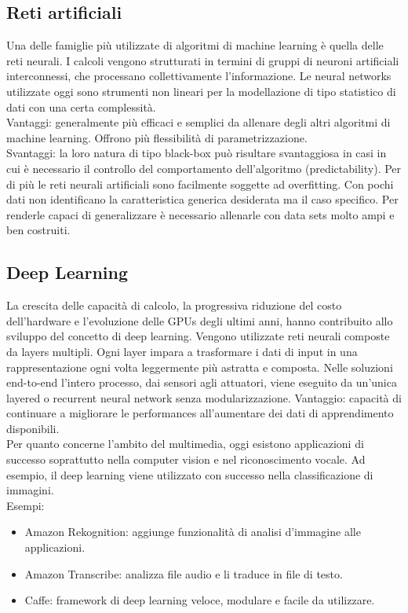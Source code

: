 \documentclass[8pt,a4paper]{article}
\begin{document}
\begin{multicols}{5}
    \subsection{Reti artificiali}
    Una delle famiglie più utilizzate di algoritmi di machine learning è quella delle
    reti neurali. I calcoli vengono strutturati in termini di gruppi di neuroni artificiali
    interconnessi, che processano collettivamente l’informazione. Le neural networks
    utilizzate oggi sono strumenti non lineari per la modellazione di tipo statistico
    di dati con una certa complessità.\\
    Vantaggi: generalmente più efficaci e semplici da allenare degli altri algoritmi
    di machine learning. Offrono più flessibilità di parametrizzazione.\\
    Svantaggi: la loro natura di tipo black-box può risultare svantaggiosa in casi in cui
    è necessario il controllo del comportamento dell’algoritmo (predictability). Per di
    più le reti neurali artificiali sono facilmente soggette ad overfitting. Con pochi dati
    non identificano la caratteristica generica desiderata ma il caso specifico.
    Per renderle capaci di generalizzare è necessario allenarle con data sets molto ampi e ben costruiti.
    
    \subsection{Deep Learning}
    La crescita delle capacità di calcolo, la progressiva riduzione del costo dell’hardware
    e l’evoluzione delle GPUs degli ultimi anni, hanno contribuito allo sviluppo del concetto
    di deep learning. Vengono utilizzate reti neurali composte da layers multipli. Ogni layer
    impara a trasformare i dati di input in una rappresentazione ogni volta leggermente più
    astratta e composta. Nelle soluzioni end-to-end l’intero processo, dai sensori agli attuatori,
    viene eseguito da un’unica layered o recurrent neural network senza modularizzazione.
    Vantaggio: capacità di continuare a migliorare le performances all’aumentare dei dati di
    apprendimento disponibili.\\
    Per quanto concerne l’ambito del multimedia, oggi esistono applicazioni di successo soprattutto
    nella computer vision e nel riconoscimento vocale. Ad esempio, il deep learning viene utilizzato
    con successo nella classificazione di immagini.\\
    Esempi:
    \begin{itemize}
    \item Amazon Rekognition: aggiunge funzionalità di analisi d’immagine alle applicazioni.
    \item Amazon Transcribe: analizza file audio e li traduce in file di testo.
    \item Caffe: framework di deep learning veloce, modulare e facile da utilizzare.
    \end{itemize}
\end{multicols}
\end{document}
